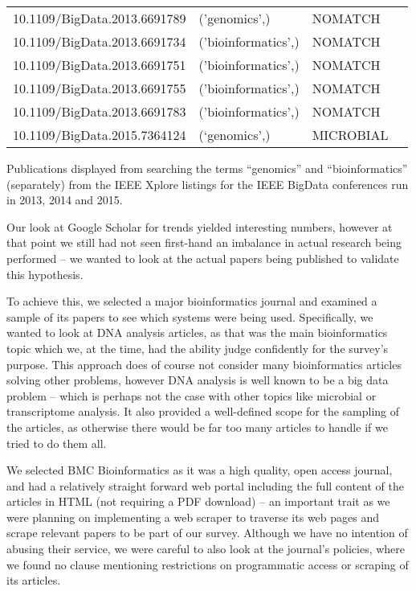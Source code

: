 \begin{table}[ht]
{\begin{threeparttable}
\begin{tabular}{l l l l}
        10.1109/BigData.2013.6691789 & ('genomics',) & NOMATCH & \\
        10.1109/BigData.2013.6691734 & ('bioinformatics',) & NOMATCH & \\
        10.1109/BigData.2013.6691751 & ('bioinformatics',) & NOMATCH & \\
        10.1109/BigData.2013.6691755 & ('bioinformatics',) & NOMATCH & \\
        10.1109/BigData.2013.6691783 & ('bioinformatics',) & NOMATCH & \\
        10.1109/BigData.2015.7364124 & (‘genomics',) & MICROBIAL & \\
        \bottomrule
      \end{tabular}
      \normalsize
      \begin{tablenotes}
        \source Publications displayed from searching the terms ``genomics'' and ``bioinformatics'' (separately) from the IEEE Xplore listings for the IEEE BigData conferences run in 2013, 2014 and 2015.
      \end{tablenotes}
    \end{threeparttable}}
  \end{table}

  Our look at Google Scholar for trends yielded interesting numbers, however at that point we still had not seen first-hand an imbalance in actual research being performed -- we wanted to look at the actual papers being published to validate this hypothesis.
  
  To achieve this, we selected a major bioinformatics journal and examined a sample of its papers to see which systems were being used. Specifically, we wanted to look at DNA analysis articles, as that was the main bioinformatics topic which we, at the time, had the ability judge confidently for the survey's purpose. This approach does of course not consider many bioinformatics articles solving other problems, however DNA analysis is well known to be a big data problem -- which is perhaps not the case with other topics like microbial or transcriptome analysis. It also provided a well-defined scope for the sampling of the articles, as otherwise there would be far too many articles to handle if we tried to do them all.

  We selected BMC Bioinformatics as it was a high quality, open access journal, and had a relatively straight forward web portal including the full content of the articles in HTML (not requiring a PDF download) -- an important trait as we were planning on implementing a web scraper to traverse its web pages and scrape relevant papers to be part of our survey. Although we have no intention of abusing their service, we were careful to also look at the journal's policies, where we found no clause mentioning restrictions on programmatic access or scraping of its articles.

